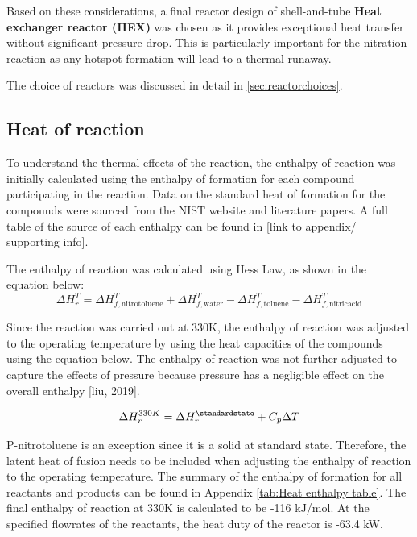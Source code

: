 Based on these considerations, a final reactor design of shell-and-tube \textbf{Heat exchanger reactor (HEX) }was chosen as it provides exceptional heat transfer without significant pressure drop. This is particularly important for the nitration reaction as any hotspot formation will lead to a thermal runaway. 

The choice of reactors was discussed in detail in \cref{sec:reactorchoices}.

\subsection{Heat of reaction}
To understand the thermal effects of the reaction, the enthalpy of reaction was initially calculated using the enthalpy of formation for each compound participating in the reaction. Data on the standard heat of formation for the compounds were sourced from the NIST website and literature papers. A full table of the source of each enthalpy can be found in [link to appendix/ supporting info]. 

The enthalpy of reaction was calculated using Hess Law, as shown in the equation below:
\begin{equation}
  \Delta H_{r}^{T} = \Delta H_{f,\mathrm{nitrotoluene}}^{T} + \Delta H_{f,\mathrm{water}}^{T} - \Delta H_{f,\mathrm{toluene}}^{T} - \Delta H_{f,\mathrm{nitric acid}}^{T}
\end{equation}

Since the reaction was carried out at 330K, the enthalpy of reaction was adjusted to the operating temperature by using the heat capacities of the compounds using the equation below. The enthalpy of reaction was not further adjusted to capture the effects of pressure because pressure has a negligible effect on the overall enthalpy [liu, 2019]. 

\begin{equation}
  \Delta H_{r}^{330K} = \Delta H_{r}^{\standardstate} + C_p \Delta T
\end{equation}

P-nitrotoluene is an exception since it is a solid at standard state. Therefore, the latent heat of fusion needs to be included when adjusting the enthalpy of reaction to the operating temperature. The summary of the enthalpy of formation for all reactants and products can be found in Appendix \ref{tab:Heat enthalpy table}. The final enthalpy of reaction at 330K is calculated to be -116 kJ/mol. At the specified flowrates of the reactants, the heat duty of the reactor is -63.4 kW.

